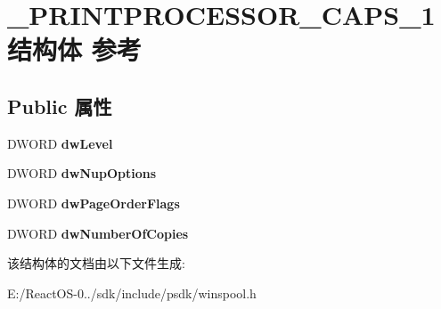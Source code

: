 \hypertarget{struct___p_r_i_n_t_p_r_o_c_e_s_s_o_r___c_a_p_s__1}{}\section{\+\_\+\+P\+R\+I\+N\+T\+P\+R\+O\+C\+E\+S\+S\+O\+R\+\_\+\+C\+A\+P\+S\+\_\+1结构体 参考}
\label{struct___p_r_i_n_t_p_r_o_c_e_s_s_o_r___c_a_p_s__1}
\subsection*{Public 属性}
\begin{DoxyCompactItemize}
\item 
\mbox{\label{struct___p_r_i_n_t_p_r_o_c_e_s_s_o_r___c_a_p_s__1_ae9caeed2dd0fb630ca3e7f52576b0601}} 
D\+W\+O\+RD {\bfseries dw\+Level}
\item 
\mbox{\label{struct___p_r_i_n_t_p_r_o_c_e_s_s_o_r___c_a_p_s__1_a05515fa6a00dc7d011f4e3b3597c1214}} 
D\+W\+O\+RD {\bfseries dw\+Nup\+Options}
\item 
\mbox{\label{struct___p_r_i_n_t_p_r_o_c_e_s_s_o_r___c_a_p_s__1_afc43a5929b406b5d660042fc474665ea}} 
D\+W\+O\+RD {\bfseries dw\+Page\+Order\+Flags}
\item 
\mbox{\label{struct___p_r_i_n_t_p_r_o_c_e_s_s_o_r___c_a_p_s__1_a0b8253fbb9fed881de52efdc1a7eadb3}} 
D\+W\+O\+RD {\bfseries dw\+Number\+Of\+Copies}
\end{DoxyCompactItemize}


该结构体的文档由以下文件生成\+:\begin{DoxyCompactItemize}
\item 
E\+:/\+React\+O\+S-\/0../sdk/include/psdk/winspool.\+h\end{DoxyCompactItemize}
